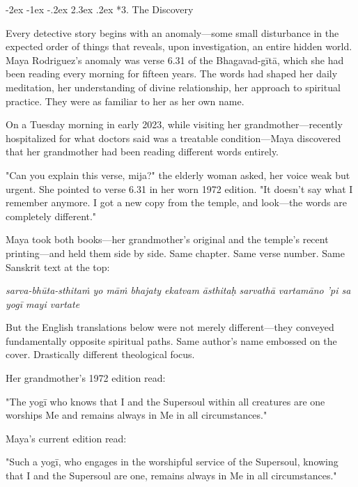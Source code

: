 \documentclass[12pt,twoside]{book}
\makeatletter
\def\cleardoublepage{\clearpage\if@twoside \ifodd\c@page\else\hbox{}\thispagestyle{empty}\newpage\if@twocolumn\hbox{}\newpage\fi\fi\fi}
\renewcommand\section{\@startsection{section}{1}{\z@}%
{-2ex \@plus -1ex \@minus -.2ex}%
{2.3ex \@plus.2ex}%
{\normalfont\Large\bfseries}}
\makeatother
\begin{document}
\cleardoublepage
\vspace*{0.20\textheight}
\section*{3. The Discovery}
\thispagestyle{chapterpage}

\normalfont\justifying
Every detective story begins with an anomaly—some small disturbance in the expected order of things that reveals, upon investigation, an entire hidden world. Maya Rodriguez's anomaly was verse 6.31 of the Bhagavad-gītā, which she had been reading every morning for fifteen years. The words had shaped her daily meditation, her understanding of divine relationship, her approach to spiritual practice. They were as familiar to her as her own name.

On a Tuesday morning in early 2023, while visiting her grandmother—recently hospitalized for what doctors said was a treatable condition—Maya discovered that her grandmother had been reading different words entirely.

"Can you explain this verse, mija?" the elderly woman asked, her voice weak but urgent. She pointed to verse 6.31 in her worn 1972 edition. "It doesn't say what I remember anymore. I got a new copy from the temple, and look—the words are completely different."

Maya took both books—her grandmother's original and the temple's recent printing—and held them side by side. Same chapter. Same verse number. Same Sanskrit text at the top:

\emph{sarva-bhūta-sthitaṁ yo māṁ bhajaty ekatvam āsthitaḥ}
\emph{sarvathā vartamāno 'pi sa yogī mayi vartate}

But the English translations below were not merely different—they conveyed fundamentally opposite spiritual paths. Same author's name embossed on the cover. Drastically different theological focus.

Her grandmother's 1972 edition read:

"The yogī who knows that I and the Supersoul within all creatures are one worships Me and remains always in Me in all circumstances."

Maya's current edition read:

"Such a yogī, who engages in the worshipful service of the Supersoul, knowing that I and the Supersoul are one, remains always in Me in all circumstances."
\end{document}
